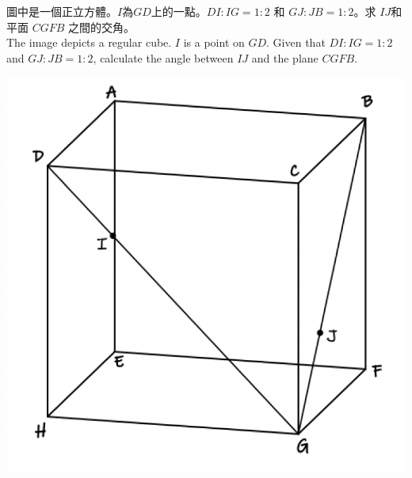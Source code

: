 \documentclass[../notmain.tex]{subfiles}
\begin{document}
\begin{questions}
        \clearpage
        \question
        圖中是一個正立方體。$I$為$GD$上的一點。$DI:IG=1:2$ 和 $GJ:JB=1:2$。求 $IJ$和平面 $CGFB$ 之間的交角。\\The image depicts a regular cube. $I$ is a point on $GD$. Given that $DI:IG=1:2$ and $GJ:JB=1:2$, calculate the angle between $IJ$ and the plane $CGFB$.\par
        \begin{center}
            \includegraphics[width=0.4\linewidth]{assets/dwq2r.png}
        \end{center}
        \clearpage
            
    \end{questions}
\clearpage
\begin{questions}
\question 
    \clearpage

\clearpage
\question
    \clearpage

\clearpage
\question
    \clearpage

\clearpage
\question
    \clearpage

\clearpage
\question
    \clearpage



    
\end{questions}
\end{document}
